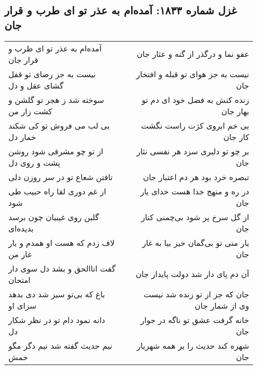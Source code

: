 \begin{center}
\section*{غزل شماره ۱۸۳۳: آمده‌ام به عذر تو ای طرب و قرار جان}
\label{sec:1833}
\begin{longtable}{l p{0.5cm} r}
آمده‌ام به عذر تو ای طرب و قرار جان
&&
عفو نما و درگذر از گنه و عثار جان
\\
نیست به جز رضای تو قفل گشای عقل و دل
&&
نیست به جز هوای تو قبله و افتخار جان
\\
سوخته شد ز هجر تو گلشن و کشت زار من
&&
زنده کنش به فضل خود ای دم تو بهار جان
\\
بی لب می فروش تو کی شکند خمار دل
&&
بی خم ابروی کژت راست نگشت کار جان
\\
از تو چو مشرقی شود روشن پشت و روی دل
&&
بر چو تو دلبری سزد هر نفسی نثار جان
\\
تافتن شعاع تو در سر روزن دلی
&&
تبصره خرد بود هر دم اعتبار جان
\\
از غم دوری لقا راه حبیب طی شود
&&
در ره و منهج خدا هست خدای یار جان
\\
گلبن روی غیبیان چون برسد بدیده‌ای
&&
از گل سرخ پر شود بی‌چمنی کنار جان
\\
لاف زدم که هست او همدم و یار غار من
&&
یار منی تو بی‌گمان خیز بیا به غار جان
\\
گفت اناالحق و بشد دل سوی دار امتحان
&&
آن دم پای دار شد دولت پایدار جان
\\
باغ که بی‌تو سبز شد دی بدهد سزای او
&&
جان که جز از تو زنده شد نیست وی از شمار جان
\\
دانه نمود دام تو در نظر شکار دل
&&
خانه گرفت عشق تو ناگه در جوار جان
\\
نیم حدیث گفته شد نیم دگر مگو خمش
&&
شهره کند حدیث را بر همه شهریار جان
\\
\end{longtable}
\end{center}
